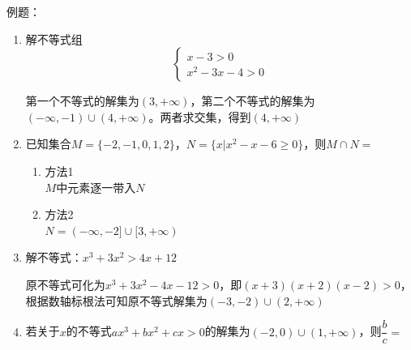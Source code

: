 例题：
\begin{enumerate}
    \item 解不等式组
        \begin{equation*}
            \left \{
                \begin{array}{c}
                    x - 3 > 0 \\
                    x^2 - 3x -4 > 0
                \end{array}
            \right.
        \end{equation*}
        \begin{jieda}
            第一个不等式的解集为$(3, +\infty)$，第二个不等式的解集为$(-\infty, -1) \cup (4, +\infty)$。两者求交集，得到$(4, +\infty)$ 
        \end{jieda}
    \item 已知集合$M = \{-2, -1, 0, 1, 2\}$，$N = \{x | x^2 - x -6 \geq 0\}$，则$M \cap N = $
    \begin{jieda}
        \begin{enumerate}
            \item 方法1 \\
            $M$中元素逐一带入$N$
            \item 方法2 \\
            $N = (-\infty, -2] \cup [3, +\infty)$
        \end{enumerate}
    \end{jieda}
    \item 解不等式：$x^3+3x^2>4x+12$
    \begin{jieda}
        原不等式可化为$x^3+3x^2-4x-12 > 0$，即$(x+3)(x+2)(x-2) > 0$，根据数轴标根法可知原不等式解集为$(-3, -2) \cup (2, +\infty)$
    \end{jieda}
    \item 若关于$x$的不等式$ax^3+bx^2+cx>0$的解集为$(-2, 0)\cup(1, +\infty)$，则$\dfrac{b}{c} = $
\end{enumerate}
